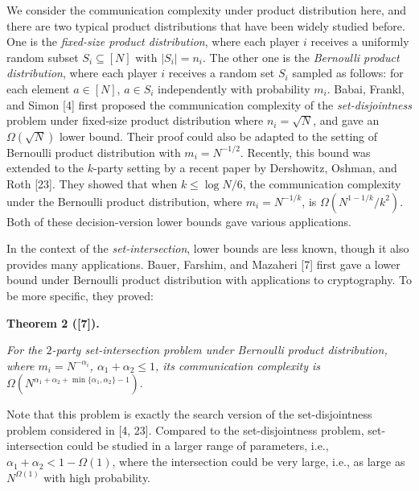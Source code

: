 We consider the communication complexity under product distribution here, and there are two typical product distributions that have been widely studied before. One is the \emph{fixed-size product distribution}, where each player $i$ receives a uniformly random subset $S_{i}\subseteq[N]$ with $|S_{i}|=n_{i}$. The other one is the \emph{Bernoulli product distribution}, where each player $i$ receives a random set $S_{i}$ sampled as follows: for each element $a\in[N]$, $a\in S_{i}$ independently with probability $m_{i}$. Babai, Frankl, and Simon [4] first proposed the communication complexity of the \emph{set-disjointness} problem under fixed-size product distribution where $n_{i}=\sqrt{N}$, and gave an $\Omega(\sqrt{N})$ lower bound. Their proof could also be adapted to the setting of Bernoulli product distribution with $m_{i}=N^{-1/2}$. Recently, this bound was extended to the $k$-party setting by a recent paper by Dershowitz, Oshman, and Roth [23]. They showed that when $k\leq\log N/6$, the communication complexity under the Bernoulli product distribution, where $m_{i}=N^{-1/k}$, is $\Omega(N^{1-1/k}/k^{2})$. Both of these decision-version lower bounds gave various applications.\par




In the context of the \emph{set-intersection}, lower bounds are less known, though it also provides many applications. Bauer, Farshim, and Mazaheri [7] first gave a lower bound under Bernoulli product distribution with applications to cryptography. To be more specific, they proved:\par





\par\medskip\noindent\textbf{
\textbf{Theorem 2}\textbf{ }([7])\textbf{.}
}\par



\emph{For the $2$-party set-intersection problem under Bernoulli product distribution, where $m_{i}=N^{-\alpha_{i}}$, $\alpha_{1}+\alpha_{2}\leq 1$, its communication complexity is $\Omega\left(N^{\alpha_{1}+\alpha_{2}+\min\{\alpha_{1},\alpha_{2}\}-1}\right).$}\par






Note that this problem is exactly the search version of the set-disjointness problem considered in [4, 23]. Compared to the set-disjointness problem, set-intersection could be studied in a larger range of parameters, i.e., $\alpha_{1}+\alpha_{2}<1-\Omega(1)$, where the intersection could be very large, i.e., as large as $N^{\Omega(1)}$ with high probability.\par




